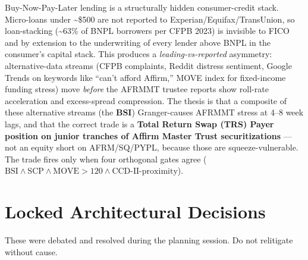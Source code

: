 \documentclass[11pt]{article}
\begin{document}
Buy-Now-Pay-Later lending is a structurally hidden consumer-credit stack. Micro-loans under \textasciitilde\$500 are not reported to Experian/Equifax/TransUnion, so loan-stacking (\textasciitilde63\% of BNPL borrowers per CFPB 2023) is invisible to FICO and by extension to the underwriting of every lender above BNPL in the consumer's capital stack. This produces a \emph{leading-vs-reported} asymmetry: alternative-data streams (CFPB complaints, Reddit distress sentiment, Google Trends on keywords like ``can't afford Affirm,'' MOVE index for fixed-income funding stress) move \emph{before} the AFRMMT trustee reports show roll-rate acceleration and excess-spread compression. The thesis is that a composite of these alternative streams (the \textbf{BSI}) Granger-causes AFRMMT stress at 4--8 week lags, and that the correct trade is a \textbf{Total Return Swap (TRS) Payer position on junior tranches of Affirm Master Trust securitizations} --- not an equity short on AFRM/SQ/PYPL, because those are squeeze-vulnerable. The trade fires only when four orthogonal gates agree ($\mathrm{BSI} \wedge \mathrm{SCP} \wedge \mathrm{MOVE}>120 \wedge \mathrm{CCD\text{-}II\text{-}proximity}$).

\section{Locked Architectural Decisions}

These were debated and resolved during the planning session. Do not relitigate without cause.
\end{document}
